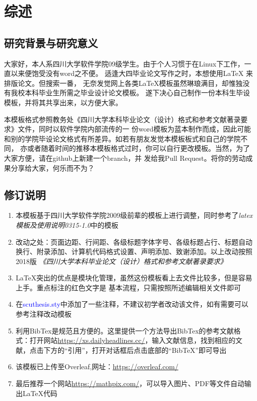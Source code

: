 	\chapter{综述}
	
	
	\section{研究背景与研究意义}
	大家好，本人系四川大学软件学院09级学生。由于个人习惯于在Linux下工作，一直以来便饱受没有word之不便。
	适逢大四毕业论文写作之时，本想使用\LaTeX{} 来排版论文。但搜索一番，
	无奈发觉网上各类\LaTeX 模板虽然琳琅满目，却惟独没有我校本科毕业生所需之毕业设计论文模板。
	遂下决心自己制作一份本科生毕设模板，并将其共享出来，以方便大家。

	本模板格式参照教务处《四川大学本科毕业论文（设计）格式和参考文献著录要求》文件，同时以软件学院内部流传的一
	份word模板为蓝本制作而成，因此可能和别的学院毕设论文格式有所差异。如若有朋友发觉本模板板式和自己的学院不同，
	亦或者随着时间的推移本模板格式过时，你可以自行更改模板。当然，为了大家方便，请在github上新建一个branch，并
	发给我Pull Request。将你的劳动成果分享给大家，何乐而不为？
	
	
	\section{修订说明}
	
	\begin{enumerate}
		\item 本模板基于四川大学软件学院2009级前辈的模板上进行调整，同时参考了\textit{latex模板及使用说明0315-1.0}中的模板
		\item
		改动之处：页面边距、行间距、各级标题字体字号、各级标题占行、标题自动换行、附录添加、计算机代码格式设置、声明添加、致谢添加。以上改动按照2018版
		\textit{《四川大学本科毕业论文（设计）格式和参考文献著录要求》}
		\item 
		\LaTeX 突出的优点是模块化管理，虽然这份模板看上去文件比较多，但是容易上手。重点标注的红色文字是
		基本流程，只需按照\textcolor{red}{}所述编辑相关文件即可
		\item
		在\textcolor{blue}{scuthesis.sty}中添加了一些注释，不建议初学者改动该文件，如有需要可以参考注释改动模板
		\item
		利用BibTex是规范且方便的。这里提供一个方法导出BibTex的参考文献格式：打开网站\textcolor{green}{\url{https://xs.dailyheadlines.cc/}}，输入文献信息，找到相应的文献，点击下方的“引用”，打开对话框后点击底部的“BibTeX”即可导出
		\item
		该模板已上传至Overleaf,网址：\textcolor{green}{\url{https://overleaf.com/}}
		\item 
		最后推荐一个网站\textcolor{green}{\url{https://mathpix.com/}}，可以导入图片、PDF等文件自动输出\LaTeX 代码
		
	\end{enumerate}
	
	
	